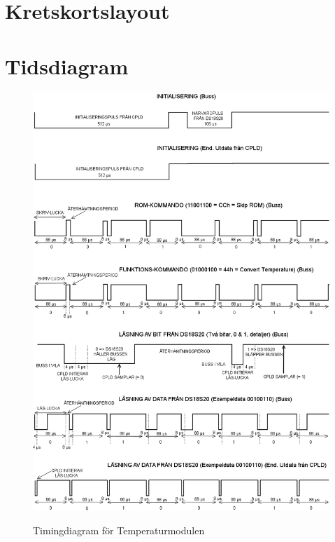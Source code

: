 \documentclass[a4paper,11pt]{article}
\begin{document}
	\section{Kretskortslayout}
	
	\section{Tidsdiagram}

		\begin{figure}[ht!tb]
		  \centering
		      \includegraphics[scale=0.5, angle=0]{TempTiming.png}
			\label{fig:TempTiming}
		  	\caption{Timingdiagram för Temperaturmodulen}
		\end{figure}
\end{document}

